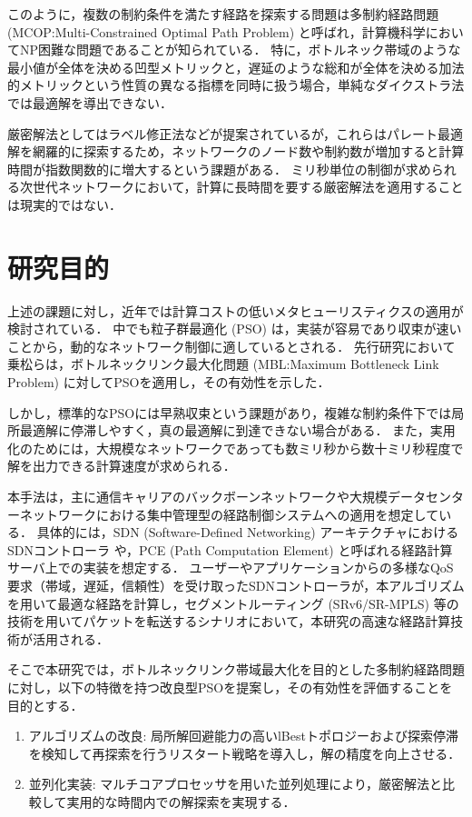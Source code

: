 このように，複数の制約条件を満たす経路を探索する問題は多制約経路問題 (MCOP:Multi-Constrained Optimal Path Problem) と呼ばれ，計算機科学においてNP困難な問題であることが知られている\cite{garey1979}．
特に，ボトルネック帯域のような最小値が全体を決める凹型メトリックと，遅延のような総和が全体を決める加法的メトリックという性質の異なる指標を同時に扱う場合，単純なダイクストラ法では最適解を導出できない．

厳密解法としてはラベル修正法などが提案されているが\cite{guerriero2001}，これらはパレート最適解を網羅的に探索するため，ネットワークのノード数や制約数が増加すると計算時間が指数関数的に増大するという課題がある．
ミリ秒単位の制御が求められる次世代ネットワークにおいて，計算に長時間を要する厳密解法を適用することは現実的ではない．

\section{研究目的}
上述の課題に対し，近年では計算コストの低いメタヒューリスティクスの適用が検討されている．
中でも粒子群最適化 (PSO) \cite{kennedy1995}は，実装が容易であり収束が速いことから，動的なネットワーク制御に適しているとされる．
先行研究において乗松らは，ボトルネックリンク最大化問題 (MBL:Maximum Bottleneck Link Problem) に対してPSOを適用し，その有効性を示した\cite{norimatsu2024}．

しかし，標準的なPSOには早熟収束という課題があり，複雑な制約条件下では局所最適解に停滞しやすく，真の最適解に到達できない場合がある．
また，実用化のためには，大規模なネットワークであっても数ミリ秒から数十ミリ秒程度で解を出力できる計算速度が求められる．

本手法は，主に通信キャリアのバックボーンネットワークや大規模データセンターネットワークにおける集中管理型の経路制御システムへの適用を想定している．
具体的には，SDN (Software-Defined Networking) アーキテクチャにおける SDNコントローラ や，PCE (Path Computation Element) と呼ばれる経路計算サーバ上での実装を想定する．
ユーザーやアプリケーションからの多様なQoS要求（帯域，遅延，信頼性）を受け取ったSDNコントローラが，本アルゴリズムを用いて最適な経路を計算し，セグメントルーティング (SRv6/SR-MPLS) 等の技術を用いてパケットを転送するシナリオにおいて，本研究の高速な経路計算技術が活用される．

そこで本研究では，ボトルネックリンク帯域最大化を目的とした多制約経路問題に対し，以下の特徴を持つ改良型PSOを提案し，その有効性を評価することを目的とする．

\begin{enumerate}
  \item アルゴリズムの改良: 局所解回避能力の高いlBestトポロジーおよび探索停滞を検知して再探索を行うリスタート戦略を導入し，解の精度を向上させる．
  \item 並列化実装: マルチコアプロセッサを用いた並列処理により，厳密解法と比較して実用的な時間内での解探索を実現する．
\end{enumerate}

